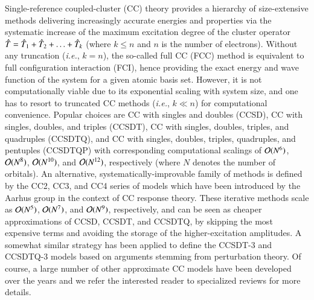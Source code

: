 \documentclass[aip,jcp,reprint,noshowkeys,superscriptaddress]{revtex4-1}
\newcommand{\ie}{\textit{i.e.}}
\newcommand{\hT}{\Hat{T}}
\begin{document}
Single-reference coupled-cluster (CC) theory provides a hierarchy of size-extensive methods delivering increasingly accurate energies and properties via the systematic increase of the maximum excitation degree of the cluster operator $\hT = \hT_1 + \hT_2 + \ldots + \hT_k$ (where $k \le n$ and $n$ is the number of electrons). \cite{Cizek_1966,Paldus_1972,Crawford_2000,Bartlett_2007,Shavitt_2009}
Without any truncation (\ie, $k = n$), the so-called full CC (FCC) method is equivalent to full configuration interaction (FCI), hence providing the exact energy and wave function of the system for a given atomic basis set.
However, it is not computationally viable due to its exponential scaling with system size, and one has to resort to truncated CC methods  (\ie, $k \ll n$) for computational convenience.
Popular choices are CC with singles and doubles (CCSD), \cite{Cizek_1966,Purvis_1982} CC with singles, doubles, and triples (CCSDT), \cite{Noga_1987a,Scuseria_1988} CC with singles, doubles, triples, and quadruples (CCSDTQ), \cite{Oliphant_1991,Kucharski_1992} and 
CC with singles, doubles, triples, quadruples, and pentuples (CCSDTQP) \cite{Hirata_2000,Kallay_2001} with corresponding computational scalings of $\order*{N^{6}}$, $\order*{N^{8}}$, $\order*{N^{10}}$, and  $\order*{N^{12}}$, respectively (where $N$ denotes the number of orbitals).
An alternative, systematically-improvable family of methods is defined by the CC2, \cite{Christiansen_1995a} CC3, \cite{Christiansen_1995b,Koch_1997} and CC4 \cite{Kallay_2005} series of models which have been introduced by the Aarhus group in the context of CC response theory. \cite{Christiansen_1998}
These iterative methods scale as $\order*{N^{5}}$, $\order*{N^{7}}$, and $\order*{N^{9}}$, respectively, and can be seen as cheaper approximations of CCSD, CCSDT, and CCSDTQ, by skipping the most expensive terms and avoiding the storage of the higher-excitation amplitudes.
A somewhat similar strategy has been applied to define the CCSDT-3 \cite{Urban_1985,Noga_1987b} and CCSDTQ-3 \cite{Kallay_2005} models based on arguments stemming from perturbation theory.
Of course, a large number of other approximate CC models have been developed over the years and we refer the interested reader to specialized reviews for more details. \cite{Crawford_2000,Piecuch_2002,Bartlett_2007,Shavitt_2009}
\end{document}
